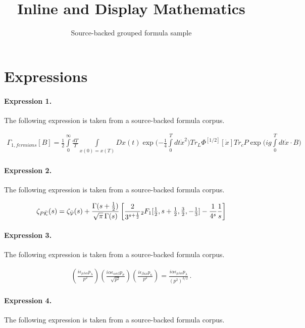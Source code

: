 \documentclass[11pt]{article}
\title{Inline and Display Mathematics}
\author{Source-backed grouped formula sample}
\date{}
\begin{document}
\maketitle
\section{Expressions}
\paragraph{Expression 1.} The following expression is taken from a source-backed formula corpus.

\begin{align*}\Gamma _{1,fermions} \left[ B \right] = \frac{1}{2}\int\limits_0^\infty {\frac{{dT}}{T}} \int\limits_{x(0) = x(T)} {Dx(t)\exp ( - \frac{1}{4}} \int\limits_0^T {dt\dot x^2 } )Tr_L \Phi ^{\left[ {1/2} \right]} \left[ {\dot x} \right]Tr_c P\exp (ig\int\limits_0^T {dt\dot x \cdot B)}\end{align*}

\paragraph{Expression 2.} The following expression is taken from a source-backed formula corpus.

\begin{align*}{\zeta_{P\bar{\cal K}}}(s)=\zeta_{\bar{\cal V}}(s)+\frac{\Gamma(s+\frac{1}{2})}{\sqrt{\pi}\,\Gamma(s)} \left[\frac{2}{3^{s+\frac{1}{2}}} {}_2F_{1}[{\textstyle\frac{1}{2}},{s+\textstyle\frac{1}{2}},{\textstyle\frac{3}{2}},-{\textstyle\frac{1}{3}}]-\frac{1}{4^s} \frac{1}{s} \right]\end{align*}

\paragraph{Expression 3.} The following expression is taken from a source-backed formula corpus.

\begin{align*}\left( \frac{i\epsilon_{\mu\lambda\alpha}p_\lambda}{p^2} \right)\left(\frac{i\alpha\epsilon_{\alpha\sigma\beta}p_\sigma}{\sqrt{p^2}} \right)\left( \frac{i\epsilon_{\beta\kappa\nu} p_\kappa}{p^2} \right)= \frac{i\alpha\epsilon_{\mu\lambda\nu}p_\lambda}{\left(p^2\right)^{3/2}} \, .\end{align*}

\paragraph{Expression 4.} The following expression is taken from a source-backed formula corpus.
\end{document}

